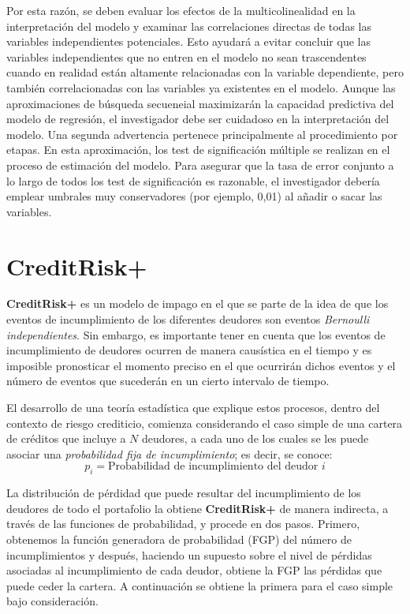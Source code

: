 \documentclass[
  12pt,
]{krantz}
\theoremstyle{definition}
\theoremstyle{definition}
\theoremstyle{definition}
\theoremstyle{remark}
\begin{document}
Por esta razón, se deben evaluar los efectos de la multicolinealidad en la interpretación del modelo y examinar las correlaciones directas de todas las variables independientes potenciales. Esto ayudará a evitar concluir que las variables independientes que no entren en el modelo no sean trascendentes cuando en realidad están altamente relacionadas con la variable dependiente, pero también correlacionadas con las variables ya existentes en el modelo. Aunque las aproximaciones de búsqueda secueneial maximizarán la capacidad predictiva del modelo de regresión, el investigador debe ser cuidadoso en la interpretación del modelo. Una segunda advertencia pertenece principalmente al procedimiento por etapas. En esta aproximación, los test de significación múltiple se realizan en el proceso de estimación del modelo. Para asegurar que la tasa de error conjunto a lo largo de todos los test de significación es razonable, el investigador debería emplear umbrales muy conservadores (por ejemplo, 0,01) al añadir o sacar las variables.

\mainmatter

\hypertarget{creditrisk}{%
\chapter{CreditRisk+}\label{creditrisk}}

\textbf{CreditRisk+} es un modelo de impago en el que se parte de la idea de que los eventos de incumplimiento de los diferentes deudores son eventos \emph{Bernoulli independientes}. Sin embargo, es importante tener en cuenta que los eventos de incumplimiento de deudores ocurren de manera causística en el tiempo y es imposible pronosticar el momento preciso en el que ocurrirán dichos eventos y el número de eventos que sucederán en un cierto intervalo de tiempo.

El desarrollo de una teoría estadística que explique estos procesos, dentro del contexto de riesgo crediticio, comienza considerando el caso simple de una cartera de créditos que incluye a \(N\) deudores, a cada uno de los cuales se les puede asociar una \emph{probabilidad fija de incumplimiento}; es decir, se conoce: \[p_i=\textrm{Probabilidad de incumplimiento del deudor } i\]

La distribución de pérdidad que puede resultar del incumplimiento de los deudores de todo el portafolio la obtiene \textbf{CreditRisk+} de manera indirecta, a través de las funciones de probabilidad, y procede en dos pasos. Primero, obtenemos la función generadora de probabilidad (FGP) del número de incumplimientos y después, haciendo un supuesto sobre el nivel de pérdidas asociadas al incumplimiento de cada deudor, obtiene la FGP las pérdidas que puede ceder la cartera. A continuación se obtiene la primera para el caso simple bajo consideración.
\end{document}
